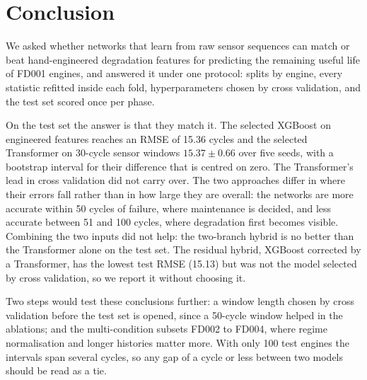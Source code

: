 \section{Conclusion}
\label{sec:conclusion}

We asked whether networks that learn from raw sensor sequences can match or
beat hand-engineered degradation features for predicting the remaining
useful life of FD001 engines, and answered it under one protocol: splits by
engine, every statistic refitted inside each fold, hyperparameters chosen by
cross validation, and the test set scored once per phase.

On the test set the answer is that they match it. The selected XGBoost on
engineered features reaches an RMSE of 15.36 cycles and the selected
Transformer on 30-cycle sensor windows $15.37 \pm 0.66$ over five seeds,
with a bootstrap interval for their difference that is centred on zero. The
Transformer's lead in cross validation did not carry over. The two
approaches differ in where their errors fall rather than in how large they
are overall: the networks are more accurate within 50 cycles of failure,
where maintenance is decided, and less accurate between 51 and 100 cycles,
where degradation first becomes visible. Combining the two inputs did not
help: the two-branch hybrid is no better than the Transformer alone on the
test set. The residual hybrid, XGBoost corrected by a Transformer, has the
lowest test RMSE (15.13) but was not the model selected by cross validation,
so we report it without choosing it.

Two steps would test these conclusions further: a window length chosen by
cross validation before the test set is opened, since a 50-cycle window
helped in the ablations; and the multi-condition subsets FD002 to FD004,
where regime normalisation and longer histories matter more. With only 100
test engines the intervals span several cycles, so any gap of a cycle or
less between two models should be read as a tie.
